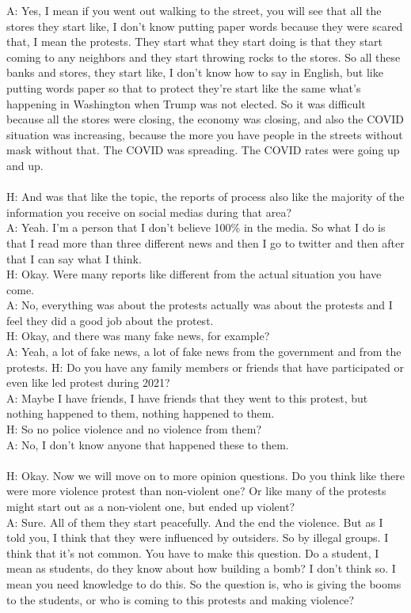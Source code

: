 \documentclass{phyasgn}\usepackage{nag}
\begin{document}
A: Yes, I mean if you went out walking to the street, you will see that all the stores they start like, I don't know putting paper words because they were scared that, I mean the protests. They start what they start doing is that they start coming to any neighbors and they start throwing rocks to the stores. So all these banks and stores, they start like, I don't know how to say in English, but like putting words paper so that to protect they're start like the same what's happening in Washington when Trump was not elected. So it was difficult because all the stores were closing, the economy was closing, and also the COVID situation was increasing, because the more you have people in the streets without mask without that. The COVID was spreading. The COVID rates were going up and up.\\
\\
H: And was that like the topic, the reports of process also like the majority of the information you receive on social medias during that area? \\
A: Yeah. I’m a person that I don't believe 100\% in the media. So what I do is that I read more than three different news and then I go to twitter and then after that I can say what I think.\\
H: Okay. Were many reports like different from the actual situation you have come.\\
A: No, everything was about the protests actually was about the protests and I feel they did a good job about the protest.\\
H: Okay, and there was many fake news, for example?\\
A: Yeah, a lot of fake news, a lot of fake news from the government and from the protests.
H: Do you have any family members or friends that have participated or even like led protest during 2021?\\
A: Maybe I have friends, I have friends that they went to this protest, but nothing happened to them, nothing happened to them.\\
H: So no police violence and no violence from them?\\
A: No, I don't know anyone that happened these to them.\\
\\
H: Okay. Now we will move on to more opinion questions. Do you think like there were more violence protest than non-violent one? Or like many of the protests might start out as a non-violent one, but ended up violent?\\
A: Sure. All of them they start peacefully. And the end the violence. But as I told you, I think that they were influenced by outsiders. So by illegal groups. I think that it's not common. You have to make this question. Do a student, I mean as students, do they know about how building a bomb? I don't think so. I mean you need knowledge to do this. So the question is, who is giving the booms to the students, or who is coming to this protests and making violence?\\
\end{document}
